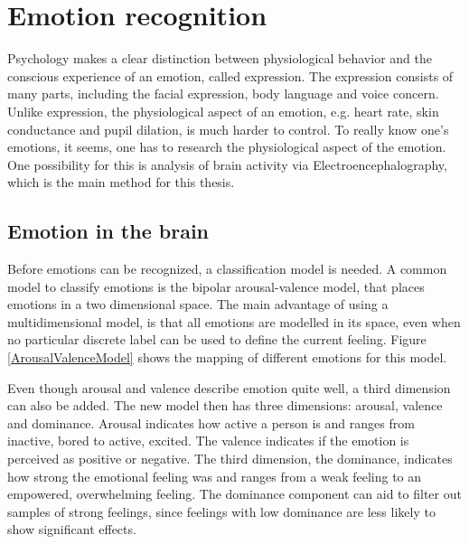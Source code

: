 \section{Emotion recognition}

Psychology makes a clear distinction between physiological behavior and the conscious experience of an emotion, called expression\cite{ExtendedPaper}. The expression consists of many parts, including the facial expression, body language and voice concern. Unlike expression, the physiological aspect of an emotion, e.g. heart rate, skin conductance and pupil dilation, is much harder to control. To really know one's emotions, it seems, one has to research the physiological aspect of the emotion. One possibility for this is analysis of brain activity via Electroencephalography\cite{EEGDatasets}, which is the main method for this thesis.


\subsection{Emotion in the brain}
\label{valarrdomspace}

Before emotions can be recognized, a classification model is needed. A common model to classify emotions is the bipolar arousal-valence model\cite{ExtendedPaper,RealTimeEEGEmotion}, that places emotions in a two dimensional space. The main advantage of using a multidimensional model, is that all emotions are modelled in its space, even when no particular discrete label can be used to define the current feeling. Figure \ref{ArousalValenceModel} shows the mapping of different emotions for this model. 

\npar
Even though arousal and valence describe emotion quite well, a third dimension can also be added. The new model then has three dimensions: arousal, valence and dominance. Arousal indicates how active a person is and ranges from inactive, bored to active, excited. The valence indicates if the emotion is perceived as positive or negative. The third dimension, the dominance, indicates how strong the emotional feeling was and ranges from a weak feeling to an empowered, overwhelming feeling. The dominance component can aid to filter out samples of strong feelings, since feelings with low dominance are less likely to show significant effects.

